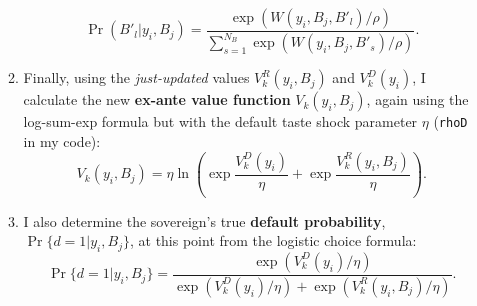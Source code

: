 \documentclass[12pt]{article}
\theoremstyle{plain}
\begin{document}
\begin{enumerate}
\begin{enumerate}
		            \begin{equation*}
			            \Pr(B'_l | y_i, B_j) = \frac{\exp(W(y_i, B_j, B'_l)/\rho)}{\sum_{s=1}^{N_B} \exp(W(y_i, B_j, B'_s)/\rho)}.
		            \end{equation*}
		      \item Finally, using the \textit{just-updated} values $V^R_k(y_i, B_j)$ and
		            $V^D_k(y_i)$, I calculate the new \textbf{ex-ante value function} $V_k(y_i,
			            B_j)$, again using the log-sum-exp formula but with the default taste shock
		            parameter $\eta$ (\texttt{rhoD} in my code):
		            \begin{equation*}
			            V_k(y_i, B_j) = \eta \ln\left( \exp\frac{V^D_k(y_i)}{\eta} + \exp\frac{V^R_k(y_i, B_j)}{\eta} \right).
		            \end{equation*}
		      \item I also determine the sovereign's true \textbf{default probability},
		            $\Pr\{d=1|y_i, B_j\}$, at this point from the logistic choice formula:
		            \begin{equation*}
			            \Pr\{d=1|y_i, B_j\} = \frac{\exp(V^D_k(y_i)/\eta)}{\exp(V^D_k(y_i)/\eta) + \exp(V^R_k(y_i, B_j)/\eta)}.
		            \end{equation*}
	      \end{enumerate}


\end{enumerate}
\end{document}
